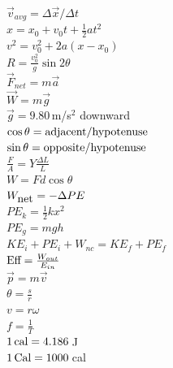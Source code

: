 \documentclass[letterpaper,addpoints,answers]{exam}
\begin{document}
 \fontseries{\seriesdefault}
 \begin{multicols}{2}
 \Large
 \noindent
 $\vec{v}_{avg} = \Delta\vec{x} / \Delta t$ \\
 $x = x_0 + v_0 t + \frac{1}{2} a t^2$ \\
 $v^2 = v_0^2 + 2 a (x - x_0)$ \\
 $R = \frac{v_0^2}{g}\sin 2\theta$ \\
 $\vec{F}_{net} = m \vec{a}$ \\
 $\vec{W} = m \vec{g}$ \\
 $\vec{g} = 9.80\,$m/s$^2$ downward \\
 $\cos\theta = \hbox{adjacent}/\hbox{hypotenuse}$ \\
 $\sin\theta = \hbox{opposite}/\hbox{hypotenuse}$ \\
 $\frac{F}{A} = Y \frac{\Delta L}{L}$ \\
 $W = F d \cos\theta$ \\
 $W_{\hbox{net}} = -\Delta PE$ \\
 $PE_k = \frac{1}{2} k x^2$ \\
 $PE_g = m g h$ \\
 $KE_i + PE_i + W_{nc} = KE_f + PE_f$ \\
 $\hbox{Eff} = \frac{W_{out}}{E_{in}}$ \\
 $\vec{p} = m \vec{v}$ \\
 $\theta = \frac{s}{r}$ \\
 $v = r \omega$ \\
 $f = \frac{1}{T}$ \\
 $1\,\hbox{cal} = 4.186$\,J \\ 
 $1\,\hbox{Cal} = 1000$\,cal \\ 


\end{multicols}
\end{document}
